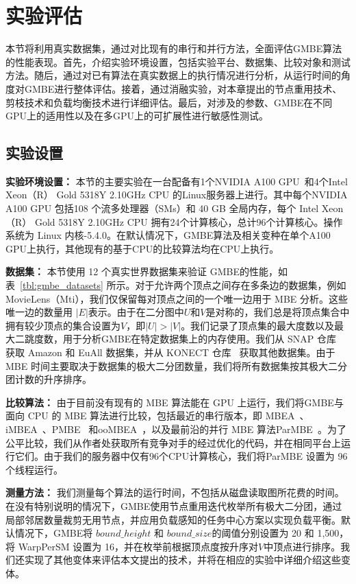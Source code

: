 \section{实验评估}
本节将利用真实数据集，通过对比现有的串行和并行方法，全面评估GMBE算法的性能表现。首先，介绍实验环境设置，包括实验平台、数据集、比较对象和测试方法。随后，通过对已有算法在真实数据上的执行情况进行分析，从运行时间的角度对GMBE进行整体评估。接着，通过消融实验，对本章提出的节点重用技术、剪枝技术和负载均衡技术进行详细评估。最后，对涉及的参数、GMBE在不同GPU上的适用性以及在多GPU上的可扩展性进行敏感性测试。

\subsection{实验设置}

\textbf{实验环境设置：} 本节的主要实验在一台配备有1个NVIDIA A100 GPU~\cite{NVIDIA-A100}和4个Intel Xeon（R） Gold 5318Y 2.10GHz CPU 的Linux服务器上进行。其中每个NVIDIA A100 GPU 包括108 个流多处理器（SMs）和 40 GB 全局内存，每个 Intel Xeon（R） Gold 5318Y 2.10GHz CPU 拥有24个计算核心，总计96个计算核心。操作系统为 Linux 内核-5.4.0。在默认情况下，GMBE算法及相关变种在单个A100 GPU上执行，其他现有的基于CPU的比较算法均在CPU上执行。



\textbf{数据集：} 本节使用 12 个真实世界数据集来验证 GMBE的性能，如表~\ref{tbl:gmbe_datasets} 所示。对于允许两个顶点之间存在多条边的数据集，例如 MovieLens（Mti），我们仅保留每对顶点之间的一个唯一边用于 MBE 分析。这些唯一边的数量用 $|E|$表示。由于在二分图中$U$和$V$是对称的，我们总是将顶点集合中拥有较少顶点的集合设置为$V$，即$|U|>|V|$。我们记录了顶点集的最大度数以及最大二跳度数，用于分析GMBE在特定数据集上的内存使用。我们从 SNAP 仓库~\cite{snapnets} 获取 Amazon 和 EuAll 数据集，并从 KONECT 仓库~\cite{konect} 获取其他数据集。由于 MBE 时间主要取决于数据集的极大二分团数量，我们将所有数据集按其极大二分团计数的升序排序。%

\textbf{比较算法：} 由于目前没有现有的 MBE 算法能在 GPU 上运行，我们将GMBE与面向 CPU 的 MBE 算法进行比较，包括最近的串行版本，即 MBEA~\cite{iMBEA14}、iMBEA~\cite{iMBEA14}、PMBE~\cite{PMBE20} 和ooMBEA~\cite{ooMBE22}，以及最前沿的并行 MBE 算法ParMBE~\cite{parMBE18}。为了公平比较，我们从作者处获取所有竞争对手的经过优化的代码，并在相同平台上运行它们。由于我们的服务器中仅有96个CPU计算核心，我们将ParMBE 设置为 96 个线程运行。

\textbf{测量方法：} 我们测量每个算法的运行时间，不包括从磁盘读取图所花费的时间。在没有特别说明的情况下，GMBE使用节点重用迭代枚举所有极大二分团，通过局部邻居数量裁剪无用节点，并应用负载感知的任务中心方案以实现负载平衡。默认情况下，GMBE将 $bound\_height$ 和 $bound\_size$的阈值分别设置为 20 和 1,500，将 \textsf{WarpPerSM} 设置为 16，并在枚举前根据顶点度按升序对$V$中顶点进行排序。我们还实现了其他变体来评估本文提出的技术，并将在相应的实验中详细介绍这些变体。



